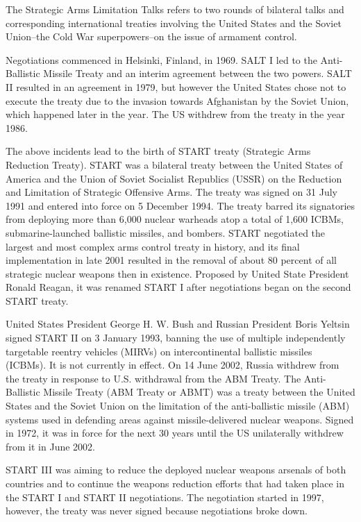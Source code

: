 \documentclass[twoside,titlepage,11pt,twocolumn,a4paper]{article}
\begin{document}
The Strategic Arms Limitation Talks refers to two rounds of bilateral
talks and corresponding international treaties involving the United
States and the Soviet Union--the Cold War superpowers--on the issue of
armament control.

Negotiations commenced in Helsinki, Finland, in 1969. SALT I led to
the Anti-Ballistic Missile Treaty and an interim agreement between the
two powers. \citep{burr2001} SALT II resulted in an agreement in 1979,
but however the United States chose not to execute the treaty due to
the invasion towards Afghanistan by the Soviet Union, which happened
later in the year. The US withdrew from the treaty in the year 1986.

The above incidents lead to the birth of START treaty (Strategic Arms
Reduction Treaty). \citep{startI} START was a bilateral treaty between
the United States of America and the Union of Soviet Socialist
Republics (USSR) on the Reduction and Limitation of Strategic
Offensive Arms. The treaty was signed on 31 July 1991 and entered into
force on 5 December 1994.  The treaty barred its signatories from
deploying more than 6,000 nuclear warheads atop a total of 1,600
ICBMs, submarine-launched ballistic missiles, and bombers. START
negotiated the largest and most complex arms control treaty in
history, and its final implementation in late 2001 resulted in the
removal of about 80 percent of all strategic nuclear weapons then in
existence. Proposed by United State President Ronald Reagan, it was
renamed START I after negotiations began on the second START treaty.

United States President George H. W. Bush and Russian President Boris
Yeltsin signed START II on 3 January 1993, banning the use of multiple
independently targetable reentry vehicles (MIRVs) on intercontinental
ballistic missiles (ICBMs). \citep{startII} It is not currently in
effect. On 14 June 2002, Russia withdrew from the treaty in response
to U.S. withdrawal from the ABM Treaty. The Anti-Ballistic Missile
Treaty (ABM Treaty or ABMT) was a treaty between the United States and
the Soviet Union on the limitation of the anti-ballistic missile (ABM)
systems used in defending areas against missile-delivered nuclear
weapons. Signed in 1972, it was in force for the next 30 years until
the US unilaterally withdrew from it in June 2002. \citep{burr2001}

START III was aiming to reduce the deployed nuclear weapons arsenals
of both countries and to continue the weapons reduction efforts that
had taken place in the START I and START II
negotiations. \citep{startIII} The negotiation started in 1997,
however, the treaty was never signed because negotiations broke down.
\end{document}
